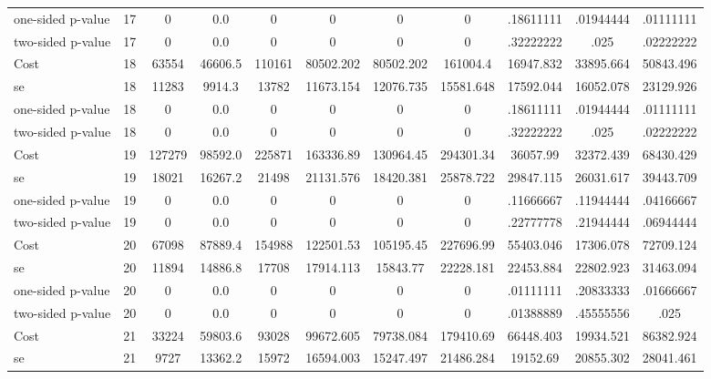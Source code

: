 \begin{tabular}{lcccccccccc}
one-sided p-value &        17 &         0 &       0.0 &         0 & 0 & 0 & 0 & .18611111 & .01944444 & .01111111 \\  
two-sided p-value &        17 &         0 &       0.0 &         0 & 0 & 0 & 0 & .32222222 & .025 & .02222222 \\  
Cost 			  &        18 &     63554 &   46606.5 &    110161 & 80502.202 & 80502.202 & 161004.4 & 16947.832 & 33895.664 & 50843.496 \\  
se 				 &        18 &     11283 &    9914.3 &     13782 & 11673.154 & 12076.735 & 15581.648 & 17592.044 & 16052.078 & 23129.926 \\  
one-sided p-value&        18 &         0 &       0.0 &         0 & 0 & 0 & 0 & .18611111 & .01944444 & .01111111 \\  
two-sided p-value&        18 &         0 &       0.0 &         0 & 0 & 0 & 0 & .32222222 & .025 & .02222222 \\  
Cost 			  &        19 &    127279 &   98592.0 &    225871 & 163336.89 & 130964.45 & 294301.34 & 36057.99 & 32372.439 & 68430.429 \\  
se 				 &        19 &     18021 &   16267.2 &     21498 & 21131.576 & 18420.381 & 25878.722 & 29847.115 & 26031.617 & 39443.709 \\  
one-sided p-value&        19 &         0 &       0.0 &         0 & 0 & 0 & 0 & .11666667 & .11944444 & .04166667 \\  
two-sided p-value&        19 &         0 &       0.0 &         0 & 0 & 0 & 0 & .22777778 & .21944444 & .06944444 \\  
Cost 			  &        20 &     67098 &   87889.4 &    154988 & 122501.53 & 105195.45 & 227696.99 & 55403.046 & 17306.078 & 72709.124 \\  
se 				  &        20 &     11894 &   14886.8 &     17708 & 17914.113 & 15843.77 & 22228.181 & 22453.884 & 22802.923 & 31463.094 \\  
one-sided p-value &        20 &         0 &       0.0 &         0 & 0 & 0 & 0 & .01111111 & .20833333 & .01666667 \\  
two-sided p-value &        20 &         0 &       0.0 &         0 & 0 & 0 & 0 & .01388889 & .45555556 & .025 \\  
Cost 			  &        21 &     33224 &   59803.6 &     93028 & 99672.605 & 79738.084 & 179410.69 & 66448.403 & 19934.521 & 86382.924 \\  
se 				 &        21 &      9727 &   13362.2 &     15972 & 16594.003 & 15247.497 & 21486.284 & 19152.69 & 20855.302 & 28041.461 \\  

\end{tabular}

